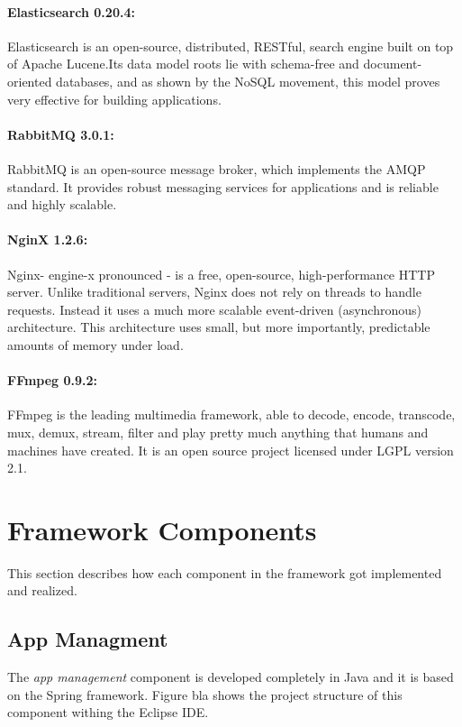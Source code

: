 \paragraph{Elasticsearch 0.20.4:} Elasticsearch is an open-source, distributed, RESTful, search engine built on top of Apache Lucene.Its data model roots lie with schema-free and document-oriented databases, and as shown by the NoSQL movement, this model proves very effective for building applications.

\paragraph{RabbitMQ 3.0.1:} RabbitMQ is an open-source message broker, which implements the AMQP standard. It provides  robust messaging services for applications and is reliable and highly scalable.

\paragraph{NginX 1.2.6:} Nginx- engine-x pronounced - is a free, open-source, high-performance HTTP server. Unlike traditional servers, Nginx does not rely on threads to handle requests. Instead it uses a much more scalable event-driven (asynchronous) architecture. This architecture uses small, but more importantly, predictable amounts of memory under load.

\paragraph{FFmpeg 0.9.2:} FFmpeg is the leading multimedia framework, able to decode, encode, transcode, mux, demux, stream, filter and play pretty much anything that humans and machines have created. It is an open source project licensed under LGPL version 2.1.
\pagebreak
\pagebreak

\section{Framework Components\label{sec:impl_used_op_sr}}
This section describes how each component in the framework got implemented and realized.

\subsection{App Managment\label{sec:impl_app_man}}
The \textit{app management} component is developed completely in Java and it is based on the Spring framework. Figure bla shows the project structure of this component withing the Eclipse IDE.

